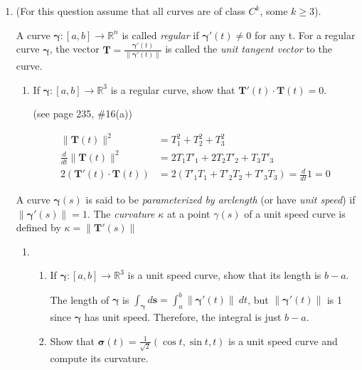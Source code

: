 \documentclass{article}
\newcommand{\norm}[1]{\| #1 \|}
\newcommand{\deriv}[1]{\frac{d}{d #1}}
\newcommand{\gam}{\boldsymbol{\gamma}}
\begin{document}
\thispagestyle{fancy}

\begin{enumerate}
    \item (For this question assume that all curves are of class $C^k$, some $k \geq 3$).

        A curve $\gam : [a,b] \rightarrow \mathbb{R}^n$ is called \textit{regular} if $\gam'(t) \not = 0$ for any t. For a regular curve $\gam$, the vector $\displaystyle \boldsymbol{T} = \frac{\gam ' (t)}{\norm{\gam '(t)}}$ is called the \textit{unit tangent vector} to the curve.
        \begin{enumerate}
            \item If $\gam : [a,b] \rightarrow \mathbb{R}^3$ is a regular curve, show that $\boldsymbol{T}'(t) \cdot \boldsymbol{T}(t) = 0$.

                (see page 235, \#16(a))

                \begin{align*}
                    \norm{\boldsymbol{T}(t)}^2 &= T_1^2 + T_2^2 + T_3^2 \\
                    \deriv{t} \norm{\boldsymbol{T}(t)}^2 &= 2 T_1T'_1 + 2T_2T'_2 + T_3T'_3 \\
                    2 (\boldsymbol{T}'(t) \cdot \boldsymbol{T}(t)) &= 2(T'_1T_1 + T'_2 T_2 + T'_3 T_3) = \deriv{t}1 = 0
                \end{align*}
        \end{enumerate}
        A curve $\gam (s)$ is said to be \textit{parameterized by arclength} (or have \textit{unit speed}) if $\norm{\gam '(s)} = 1$. The \textit{curvature} $\kappa$ at a point $\gamma(s)$ of a unit speed curve is defined by $\kappa = \norm{\boldsymbol{T}'(s)}$
        \begin{enumerate}[resume]
            \item
                \begin{enumerate}[label=(\roman*)]
                    \item If $\gam : [a,b] \rightarrow \mathbb{R}^3$ is a unit speed curve, show that its length is $b - a$.

                        The length of $\gam$ is $\displaystyle \int_{\gam} d \boldsymbol{s} = \int_a^b \norm{\gam ' (t)} \ dt$, but $\norm{\gam ' (t)}$ is 1 since $\gam$ has unit speed. Therefore, the integral is just $b-a$.

                    \item Show that $\boldsymbol{\sigma}(t) = \frac{1}{\sqrt{2}}(\cos t, \sin t, t)$ is a unit speed curve and compute its curvature.
                        

\end{enumerate}
\end{enumerate}
\end{enumerate}
\end{document}
